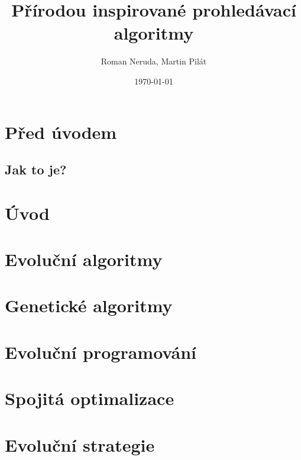 \documentclass[a4paper,nofonts,nohyper,justified,colorinlistoftodos,hidelinks]{tufte-book}
\title{Přírodou inspirované prohledávací algoritmy}
\author{Roman Neruda, Martin Pilát}
\date{\today}
\begin{document}
\maketitle

\mainmatter

\chapter{Před úvodem}
\section{Jak to je?}

%

\chapter{Úvod}


\chapter{Evoluční algoritmy}


\chapter{Genetické algoritmy}


\chapter{Evoluční programování}


\chapter{Spojitá optimalizace}


\chapter{Evoluční strategie}

\end{document}
